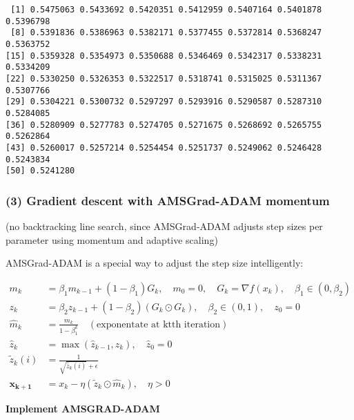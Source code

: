 \documentclass[
  letterpaper,
  DIV=11,
  numbers=noendperiod]{scrartcl}
\begin{document}
\begin{verbatim}
 [1] 0.5475063 0.5433692 0.5420351 0.5412959 0.5407164 0.5401878 0.5396798
 [8] 0.5391836 0.5386963 0.5382171 0.5377455 0.5372814 0.5368247 0.5363752
[15] 0.5359328 0.5354973 0.5350688 0.5346469 0.5342317 0.5338231 0.5334209
[22] 0.5330250 0.5326353 0.5322517 0.5318741 0.5315025 0.5311367 0.5307766
[29] 0.5304221 0.5300732 0.5297297 0.5293916 0.5290587 0.5287310 0.5284085
[36] 0.5280909 0.5277783 0.5274705 0.5271675 0.5268692 0.5265755 0.5262864
[43] 0.5260017 0.5257214 0.5254454 0.5251737 0.5249062 0.5246428 0.5243834
[50] 0.5241280
\end{verbatim}

\subsubsection{(3) Gradient descent with AMSGrad-ADAM
momentum}\label{gradient-descent-with-amsgrad-adam-momentum}

(no backtracking line search, since AMSGrad-ADAM adjusts step sizes per
parameter using momentum and adaptive scaling)

AMSGrad-ADAM is a special way to adjust the step size intelligently:

\[
\begin{aligned}
m_k &= \beta_1m_{k-1} + (1-\beta_1)G_k, \quad m_0 = 0, \quad G_k = \nabla f(x_k), \quad \beta_1∈(0, \beta_2)\\
z_k &= \beta_2 z_{k-1} + (1-\beta_2)(G_k \odot G_k), \quad \beta_2∈(0, 1), \quad z_0=0\\
\hat{m}_k &= \frac{m_k}{1 - \beta_1^k} \quad(\text{exponentate at ktth iteration})\\
\hat{z}_k &= \max(\hat{z}_{k-1}, z_k), \quad \hat{z}_0 = 0 \\
\tilde{z}_k(i) &= \frac{1}{\sqrt{\hat{z}_k(i)} + \epsilon}\\ 
\mathbf{x_{k+1}} &= \boxed{x_k - \eta(\tilde{z}_k \odot \hat{m}_k), \quad \eta > 0}
\end{aligned}
\]

\textbf{Implement AMSGRAD-ADAM}
\end{document}
